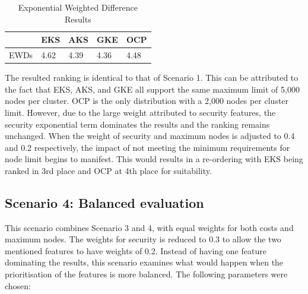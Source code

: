 \begin{table}[!ht]
    \centering
    \begin{tabular}{|p{4cm}|p{2cm}|p{2cm}|p{2cm}|p{2cm}|} %
    \hline
         & EKS& AKS& GKE& OCP\\ \hline
 EWDs& 4.62& 4.39 & 4.36 & 4.48\\\hline
    \end{tabular}
    \caption{Exponential Weighted Difference Results} 
    \label{tab:cost-analysis}
\end{table}

The resulted ranking is identical to that of Scenario 1. This can be attributed to the fact that EKS, AKS, and GKE all support the same maximum limit of 5,000 nodes per cluster. OCP is the only distribution with a 2,000 nodes per cluster limit. However, due to the large weight attributed to security features, the security exponential term dominates the results and the ranking remains unchanged. When the weight of security and maximum nodes is adjusted to 0.4 and 0.2 respectively, the impact of not meeting the minimum requirements for node limit begins to manifest. This would results in a re-ordering with EKS being ranked in 3rd place and OCP at 4th place for suitability.

\subsection{Scenario 4: Balanced evaluation}

This scenario combines Scenario 3 and 4, with equal weights for both costs and maximum nodes. The weights for security is reduced to 0.3 to allow the two mentioned features to have weights of 0.2. Instead of having one feature dominating the results, this scenario examines what would happen when the prioritisation of the features is more balanced. The following parameters were chosen:

